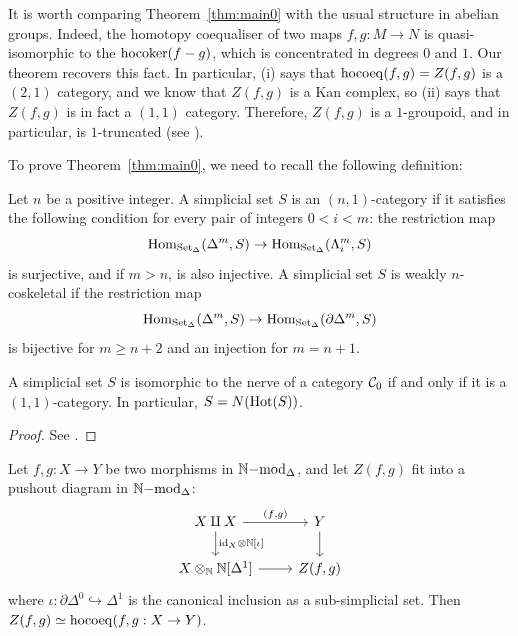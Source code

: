 \begin{remark}
It is worth comparing Theorem~\ref{thm:main0} with the usual structure in abelian groups. 
Indeed, the homotopy coequaliser of two maps $f,g: M \to N$ is quasi-isomorphic to the $\hocoker(f-g)$, 
which is concentrated in degrees $0$ and $1$. 
Our theorem recovers this fact. 
In particular, (i) says that $\hocoeq(f,g)=Z(f,g)$ is a $(2,1)$ category, and we know that $Z(f,g)$ is a Kan complex, so (ii) says that $Z(f,g)$ 
is in fact a $(1,1)$ category. Therefore, $Z(f,g)$ is a $1$-groupoid, and in particular, is $1$-truncated (see \cite[3.5]{keradon}).
\end{remark}
To prove Theorem~\ref{thm:main0}, we need to recall the following definition:
\begin{definition}\label{def:n1cat}
Let $n$ be a positive integer. A simplicial set $S$ is an $(n,1)$-category if it satisfies the following condition for every pair of integers $0 < i < m$: 
the restriction map 
\[\Hom_{\text{Set}_{\Delta}}(\Delta^m, S) \to \Hom_{\text{Set}_{\Delta}}(\Lambda_i^m, S)\]
is surjective, and if $m > n$, is also injective. A simplicial set $S$ is weakly $n$-coskeletal if the restriction map
\[\Hom_{\text{Set}_{\Delta}}(\Delta^m, S) \to \Hom_{\text{Set}_{\Delta}}(\partial \Delta^m, S)\]
is bijective for $m \ge n+2$ and an injection for $m=n+1$.
\end{definition}
\begin{proposition}\label{prop:11cat}
A simplicial set $S$ is isomorphic to the nerve of a category $\cal{C}_0$ if and only if it is a $(1,1)$-category. 
In particular, $S=N(\Hot(S))$.
\end{proposition}
\begin{proof}
See \cite[Proposition 1.3.4.1]{keradon}.
\end{proof}
\begin{proposition}\label{prop:coeqN}
Let $f,g: X \to Y$ be two morphisms in $\simpmod{\bb{N}}$, and let $Z(f,g)$ fit into a pushout diagram in $\simpmod{\bb{N}}$:
\[\begin{tikzcd}
X \amalg X \arrow[d, "\text{id}_X \otimes {\bb{N}[\iota]}"] \arrow[r, "(f\text{,}g)"] & Y \arrow[d]\\
X \otimes_{\bb{N}} {\bb{N}[\Delta^1]}\arrow[r] & Z(f,g)
\end{tikzcd}\]
where $\iota: \partial \Delta^0 \hookrightarrow \Delta^1$ is the canonical inclusion as a sub-simplicial set. Then $Z(f,g) \simeq \hocoeq(f,g:X \to Y)$.
\end{proposition}
